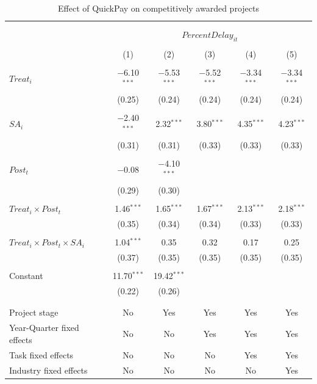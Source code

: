 \documentclass[
]{article}
\begin{document}
\begin{table}[H] \centering 
  \caption{Effect of QuickPay on competitively awarded projects} 
  \label{} 
\small 
\begin{tabular}{@{\extracolsep{-2pt}}lccccc} 
\\[-1.8ex]\hline 
\hline \\[-1.8ex] 
\\[-1.8ex] & \multicolumn{5}{c}{$PercentDelay_{it}$  } \\ 
\\[-1.8ex] & (1) & (2) & (3) & (4) & (5)\\ 
\hline \\[-1.8ex] 
 $Treat_i$ & $-$6.10$^{***}$ & $-$5.53$^{***}$ & $-$5.52$^{***}$ & $-$3.34$^{***}$ & $-$3.34$^{***}$ \\ 
  & (0.25) & (0.24) & (0.24) & (0.24) & (0.24) \\ 
  & & & & & \\ 
 $SA_i$ & $-$2.40$^{***}$ & 2.32$^{***}$ & 3.80$^{***}$ & 4.35$^{***}$ & 4.23$^{***}$ \\ 
  & (0.31) & (0.31) & (0.33) & (0.33) & (0.33) \\ 
  & & & & & \\ 
 $Post_t$ & $-$0.08 & $-$4.10$^{***}$ &  &  &  \\ 
  & (0.29) & (0.30) &  &  &  \\ 
  & & & & & \\ 
 $Treat_i \times Post_t$ & 1.46$^{***}$ & 1.65$^{***}$ & 1.67$^{***}$ & 2.13$^{***}$ & 2.18$^{***}$ \\ 
  & (0.35) & (0.34) & (0.34) & (0.33) & (0.33) \\ 
  & & & & & \\ 
 $Treat_i \times Post_t \times SA_i $ & 1.04$^{***}$ & 0.35 & 0.32 & 0.17 & 0.25 \\ 
  & (0.37) & (0.35) & (0.35) & (0.35) & (0.35) \\ 
  & & & & & \\ 
 Constant & 11.70$^{***}$ & 19.42$^{***}$ &  &  &  \\ 
  & (0.22) & (0.26) &  &  &  \\ 
  & & & & & \\ 
\hline \\[-1.8ex] 
Project stage & No & Yes & Yes & Yes & Yes \\ 
Year-Quarter fixed effects & No & No & Yes & Yes & Yes \\ 
Task fixed effects & No & No & No & Yes & Yes \\ 
Industry fixed effects & No & No & No & No & Yes \\ 

\end{tabular}
\end{table}
\end{document}
